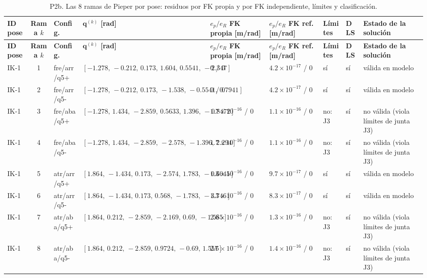 \begingroup
\scriptsize
\setlength{\tabcolsep}{2.5pt}
\renewcommand{\arraystretch}{1.12}
\begin{longtable}{lcllllllp{5.2cm}}
\caption{P2b. Las 8 ramas de Pieper por pose: residuos por FK propia y por FK independiente, límites y clasificación.}\label{tab:P2b}\\
\toprule
\textbf{ID pose} & \textbf{Rama $k$} & \textbf{Config.} & \textbf{$\mathbf{q}^{(k)}$ [rad]} & \textbf{$e_p/e_R$ FK propia [m/rad]} & \textbf{$e_p/e_R$ FK ref. [m/rad]} & \textbf{Límites} & \textbf{DLS} & \textbf{Estado de la solución} \\
\midrule
\endfirsthead
\toprule
\textbf{ID pose} & \textbf{Rama $k$} & \textbf{Config.} & \textbf{$\mathbf{q}^{(k)}$ [rad]} & \textbf{$e_p/e_R$ FK propia [m/rad]} & \textbf{$e_p/e_R$ FK ref. [m/rad]} & \textbf{Límites} & \textbf{DLS} & \textbf{Estado de la solución} \\
\midrule
\endhead
\bottomrule
\endfoot
IK-1 & 1 & fre/arr/q5+ & $[-1.278,\,-0.212,\,0.173,\,1.604,\,0.5541,\,-2.347]$ & $0$ / $0$ & $4.2\times10^{-17}$ / $0$ & s\'i & sí & v\'alida en modelo \\
IK-1 & 2 & fre/arr/q5- & $[-1.278,\,-0.212,\,0.173,\,-1.538,\,-0.5541,\,0.7941]$ & $0$ / $0$ & $4.2\times10^{-17}$ / $0$ & s\'i & sí & v\'alida en modelo \\
IK-1 & 3 & fre/aba/q5+ & $[-1.278,\,1.434,\,-2.859,\,0.5633,\,1.396,\,-0.8472]$ & $1.7\times10^{-16}$ / $0$ & $1.1\times10^{-16}$ / $0$ & no: J3 & sí & no v\'alida (viola l\'imites de junta J3) \\
IK-1 & 4 & fre/aba/q5- & $[-1.278,\,1.434,\,-2.859,\,-2.578,\,-1.396,\,2.294]$ & $1.7\times10^{-16}$ / $0$ & $1.1\times10^{-16}$ / $0$ & no: J3 & sí & no v\'alida (viola l\'imites de junta J3) \\
IK-1 & 5 & atr/arr/q5+ & $[1.864,\,-1.434,\,0.173,\,-2.574,\,1.783,\,-0.6045]$ & $1.3\times10^{-16}$ / $0$ & $9.7\times10^{-17}$ / $0$ & s\'i & sí & v\'alida en modelo \\
IK-1 & 6 & atr/arr/q5- & $[1.864,\,-1.434,\,0.173,\,0.568,\,-1.783,\,-3.746]$ & $1.3\times10^{-16}$ / $0$ & $8.3\times10^{-17}$ / $0$ & s\'i & sí & v\'alida en modelo \\
IK-1 & 7 & atr/aba/q5+ & $[1.864,\,0.212,\,-2.859,\,-2.169,\,0.69,\,-1.585]$ & $2.6\times10^{-16}$ / $0$ & $1.3\times10^{-16}$ / $0$ & no: J3 & sí & no v\'alida (viola l\'imites de junta J3) \\
IK-1 & 8 & atr/aba/q5- & $[1.864,\,0.212,\,-2.859,\,0.9724,\,-0.69,\,1.557]$ & $2.6\times10^{-16}$ / $0$ & $1.4\times10^{-16}$ / $0$ & no: J3 & sí & no v\'alida (viola l\'imites de junta J3) \\

\end{longtable}
